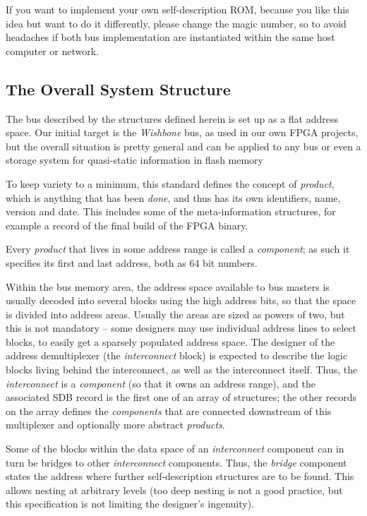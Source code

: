 \documentclass[a4paper, 12pt]{article}
\begin{document}
If you want to implement your own self-description ROM, because you like
this idea but want to do it differently, please change the magic number, so to avoid
headaches if both bus implementation are instantiated within the same host
computer or network.

\subsection{The Overall System Structure}

The bus described by the structures defined herein is set up as a
flat address space. Our initial target is the \textit{Wishbone} bus,
as used in our own FPGA projects, but the overall situation is
pretty general and can be applied to any bus or even a storage
system for quasi-static information in flash memory

To keep variety to a minimum, this standard defines the concept of
\textit{product}, which is anything that has been \textit{done}, and thus has
its own identifiers, name, version and date.  This includes some of
the meta-information structures, for example a record of the final build of the
FPGA binary.

Every \textit{product} that lives in some address range is called a
\textit{component}; as such it specifies its first and last address, both as
64 bit numbers.

Within the bus memory area, the address space available to bus masters
is usually decoded into several blocks using the high address bits, so
that the space is divided into address areas. Usually the areas are sized
as powers of two, but this is not mandatory -- some designers may use
individual address lines to select blocks, to easily get a sparsely
populated address space.  The designer of the address demultiplexer
(the \textit{interconnect} block) is expected to describe the
logic blocks living behind the interconnect, as well as the
interconnect itself. Thus, the \textit{interconnect} is a \textit{component}
(so that it owns an address range), and the associated SDB record is the first
one of an array of structures; the other records on the array
defines the \textit{components} that are connected downstream of this multiplexer
and optionally more abstract \textit{products}.

Some of the blocks within the data space of an \textit{interconnect}
component can in turn be
bridges to other \textit{interconnect} components.  Thus, the \textit{bridge}
component states the address where further self-description structures are to
be found. This allows nesting at arbitrary levels (too deep nesting is
not a good practice, but this specification is not limiting the
designer's ingenuity).
\end{document}
